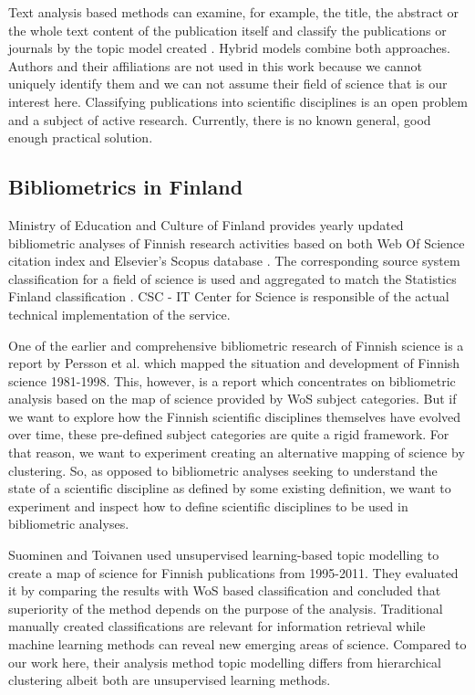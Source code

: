 Text analysis based methods can examine, for example, the title, the 
abstract or the whole text content of the publication itself and 
classify the publications or journals by the topic model created 
\cite{blei_latent_2003}.
Hybrid models combine both approaches. 
Authors and their affiliations are not used in this work because 
we cannot uniquely identify them and we can not assume their field 
of science that is our interest here.
Classifying publications into scientific disciplines is an open
problem and a subject of active research. Currently, there is no 
known general, good enough practical solution.


\subsection{Bibliometrics in Finland}
Ministry of Education and Culture of Finland provides yearly
updated bibliometric analyses of Finnish research activities 
based on both Web Of Science citation index 
and Elsevier's Scopus database \cite[Vipunen 
service]{noauthor_ministry_2020}. The corresponding source 
system classification for a field of science is used and
aggregated to match the Statistics Finland classification 
\cite{auranen_tieteen_2018}. CSC - 
IT Center for Science is responsible of the actual technical 
implementation of the service.

One of the earlier and comprehensive bibliometric research of 
Finnish science is a report by Persson et al. 
\cite{persson_bibliometric_2000} which mapped the situation and 
development of Finnish science 1981-1998.
This, however, is a report which concentrates on bibliometric 
analysis based on the map of science provided by WoS subject 
categories. But if we want to explore how the Finnish scientific 
disciplines themselves have evolved over time, these pre-defined 
subject categories are quite a rigid framework. For that reason, we 
want to experiment creating an alternative mapping of science by 
clustering. 
So, as opposed to bibliometric analyses seeking to understand the
state of a scientific discipline as defined by some existing 
definition, we want to experiment and inspect how to define 
scientific disciplines to be used in bibliometric analyses.


Suominen and Toivanen \cite{suominen_map_2016} used unsupervised learning-based topic 
modelling to create a map of science for Finnish publications from 
1995-2011. They evaluated it by comparing the results with WoS 
based classification and concluded that superiority of the method
depends on the purpose of the analysis. Traditional manually created 
classifications are relevant for information retrieval while 
machine learning methods can reveal new emerging areas of science.
Compared to our work here, their 
analysis method topic modelling differs from hierarchical 
clustering albeit both are unsupervised learning methods.

